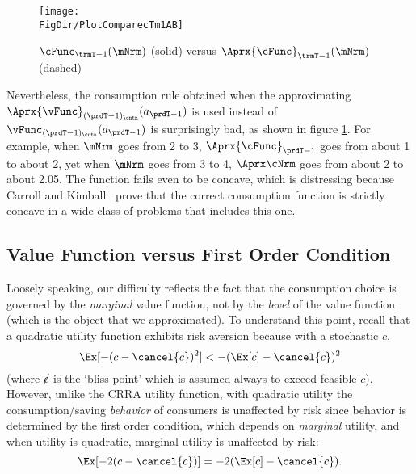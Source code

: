 \documentclass[\econtexRoot/SolvingMicroDSOPs]{subfiles}
\begin{document}
\hypertarget{PlotComparecTm1AB}{}
\begin{figure}
  \centerline{\texttt{[image: \\FigDir/PlotComparecTm1AB]}}
  \caption{$\cFunc_{\trmT-1}(\mNrm)$ (solid) versus $\Aprx{\cFunc}_{\trmT-1}(\mNrm)$ (dashed)}
  \label{fig:PlotComparecTm1AB}
\end{figure}


Nevertheless, the consumption rule obtained when the approximating $\Aprx{\vFunc}_{(\prdT-1)_\cntn}(a_{\prdT-1})$ is used instead of $\vFunc_{(\prdT-1)_\cntn}(a_{\prdT-1})$ is surprisingly bad, as shown in figure \ref{fig:PlotComparecTm1AB}.  For example, when $\mNrm$ goes from 2 to 3, $\Aprx{\cFunc}_{\prdT-1}$ goes from about 1 to about 2, yet when $\mNrm$ goes from 3 to 4, $\Aprx\cNrm$ goes from about 2 to about 2.05.  The function fails even to be concave, which is distressing because Carroll and Kimball~\citeyearpar{ckConcavity} prove that the correct consumption function is strictly concave in a wide class of problems that includes this one.

\hypertarget{value-function-versus-first-order-condition}{}
\subsection{Value Function versus First Order Condition}\label{subsec:vVsuP}

Loosely speaking, our difficulty reflects the fact that the
consumption choice is governed by the \textit{marginal} value function,
not by the \textit{level} of the value function (which is the object that
we approximated).  To understand this point, recall that a quadratic
utility function
exhibits risk aversion because with a stochastic $c$,
\begin{equation}
  \Ex[-(c - \cancel{c})^{2}] < - (\Ex[c] - \cancel{c})^{2}
\end{equation}
(where $\cancel{c}$ is the `bliss point' which is assumed always to exceed feasible $c$). However, unlike the CRRA utility function,
with quadratic utility the consumption/saving \textit{behavior} of consumers
is unaffected by risk since behavior is determined by the first order condition, which
depends on \textit{marginal} utility, and when utility is quadratic, marginal utility is unaffected
by risk:
\begin{equation}
  \Ex[-2(c - \cancel{c})] = - 2(\Ex[c] - \cancel{c}).
\end{equation}
\end{document}
